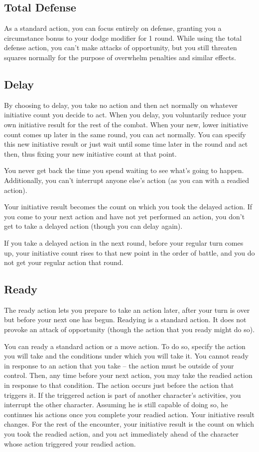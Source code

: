 \subsection{Total Defense}\label{Total Defense}
As a standard action, you can focus entirely on defense, granting you a  circumstance bonus to your dodge modifier for 1 round. While using the total defense action, you can't make attacks of opportunity, but you still threaten squares normally for the purpose of overwhelm penalties and similar effects.

\subsection{Delay}\label{Delay}
By choosing to delay, you take no action and then act normally on whatever initiative count you decide to act. When you delay, you voluntarily reduce your own initiative result for the rest of the combat. When your new, lower initiative count comes up later in the same round, you can act normally. You can specify this new initiative result or just wait until some time later in the round and act then, thus fixing your new initiative count at that point.

You never get back the time you spend waiting to see what's going to happen. Additionally, you can't interrupt anyone else's action (as you can with a readied action).

 Your initiative result becomes the count on which you took the delayed action. If you come to your next action and have not yet performed an action, you don't get to take a delayed action (though you can delay again).

If you take a delayed action in the next round, before your regular turn comes up, your initiative count rises to that new point in the order of battle, and you do not get your regular action that round.

\subsection{Ready}\label{Ready}
The ready action lets you prepare to take an action later, after your turn is over but before your next one has begun. Readying is a standard action. It does not provoke an attack of opportunity (though the action that you ready might do so).

 You can ready a standard action or a move action. To do so, specify the action you will take and the conditions under which you will take it. You cannot ready in response to an action that you take -- the action must be outside of your control. Then, any time before your next action, you may take the readied action in response to that condition. The action occurs just before the action that triggers it. If the triggered action is part of another character's activities, you interrupt the other character. Assuming he is still capable of doing so, he continues his actions once you complete your readied action. Your initiative result changes. For the rest of the encounter, your initiative result is the count on which you took the readied action, and you act immediately ahead of the character whose action triggered your readied action.

